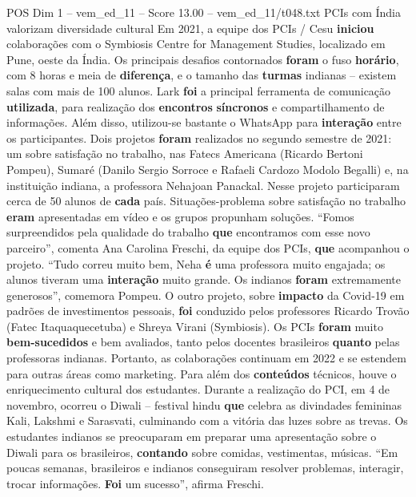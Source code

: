 \begin{textsample}{POS Dim 1 – vem\_ed\_11 – Score 13.00 – vem\_ed\_11/t048.txt}  \label{ex:f1_pos_147}
PCIs com Índia valorizam diversidade cultural Em 2021, a equipe dos PCIs / Cesu \textbf{iniciou} colaborações com o Symbiosis Centre for Management Studies, localizado em Pune, oeste da Índia.
Os principais desafios contornados \textbf{foram} o fuso \textbf{horário}, com 8 horas e meia de \textbf{diferença}, e o tamanho das \textbf{turmas} indianas – existem salas com mais de 100 alunos.
Lark \textbf{foi} a principal ferramenta de comunicação \textbf{utilizada}, para realização dos \textbf{encontros} \textbf{síncronos} e compartilhamento de informações.
Além disso, utilizou-se bastante o WhatsApp para \textbf{interação} entre os participantes.
Dois projetos \textbf{foram} realizados no segundo semestre de 2021: um sobre satisfação no trabalho, nas Fatecs Americana (Ricardo Bertoni Pompeu), Sumaré (Danilo Sergio Sorroce e Rafaeli Cardozo Modolo Begalli) e, na instituição indiana, a professora Nehajoan Panackal.
Nesse projeto participaram cerca de 50 alunos de \textbf{cada} país.
Situações-problema sobre satisfação no trabalho \textbf{eram} apresentadas em vídeo e os grupos propunham soluções. “Fomos surpreendidos pela qualidade do trabalho \textbf{que} encontramos com esse novo parceiro”, comenta Ana Carolina Freschi, da equipe dos PCIs, \textbf{que} acompanhou o projeto. “Tudo correu muito bem, Neha \textbf{é} uma professora muito engajada; os alunos tiveram uma \textbf{interação} muito grande.
Os indianos \textbf{foram} extremamente generosos”, comemora Pompeu.
O outro projeto, sobre \textbf{impacto} da Covid-19 em padrões de investimentos pessoais, \textbf{foi} conduzido pelos professores Ricardo Trovão (Fatec Itaquaquecetuba) e Shreya Virani (Symbiosis).
Os PCIs \textbf{foram} muito \textbf{bem-sucedidos} e bem avaliados, tanto pelos docentes brasileiros \textbf{quanto} pelas professoras indianas.
Portanto, as colaborações continuam em 2022 e se estendem para outras áreas como marketing.
Para além dos \textbf{conteúdos} técnicos, houve o enriquecimento cultural dos estudantes.
Durante a realização do PCI, em 4 de novembro, ocorreu o Diwali – festival hindu \textbf{que} celebra as divindades femininas Kali, Lakshmi e Sarasvati, culminando com a vitória das luzes sobre as trevas.
Os estudantes indianos se preocuparam em preparar uma apresentação sobre o Diwali para os brasileiros, \textbf{contando} sobre comidas, vestimentas, músicas. “Em poucas semanas, brasileiros e indianos conseguiram resolver problemas, interagir, trocar informações. \textbf{Foi} um sucesso”, afirma Freschi.

\end{textsample}
